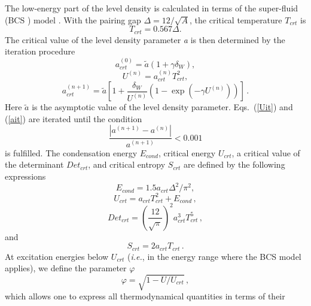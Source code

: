 The low-energy part of the level density is calculated in terms of the
super-fluid (BCS%
) model \cite{igna}. With the pairing gap $\Delta=12/%
\sqrt{A}$, the critical temperature $T_{crt}$ is
\begin{equation}
T_{crt}=0.567\Delta.  \label{Tcrt}
\end{equation}
The critical value of the level density parameter \emph{a} is then
determined by the iteration procedure
\begin{equation}
a_{crt}^{(0)}=\widetilde{a}\left(1+\gamma\delta_{W}\right),  \label{ait0}
\end{equation}
\begin{equation}
U^{(n)}=a_{crt}^{(n)}T_{crt}^{2},  \label{Uit}
\end{equation}
\begin{equation}
a_{crt}^{(n+1)}=\widetilde{a}\left[1+\frac{\delta_{W}}{U^{(n)}}%
\left(1-\exp\left(-\gamma U^{(n)}\right)\right)\right]\,.  \label{ait}
\end{equation}
Here $\widetilde{a}$ is the asymptotic value of the level density
parameter. Eqs.~(\ref{Uit}) and (\ref{ait}) are iterated until the condition
\begin{equation}
\frac{\left|a^{(n+1)}-a^{(n)}\right|}{a^{(n+1)}}<0.001  \label{itercond}
\end{equation}
is fulfilled. The condensation energy $E_{cond}$, critical energy $U_{crt}$,
a critical value of the determinant $Det_{crt}$, and critical entropy $%
S_{crt}$ are defined by the following expressions
\begin{equation}
E_{cond}=1.5a_{crt}\Delta^{2}/\pi^{2},  \label{Econd}
\end{equation}
\begin{equation}
U_{crt}=a_{crt}T_{crt}^{2}+E_{cond}\,,  \label{Ucrt}
\end{equation}
\begin{equation}
Det_{crt}=\left(\frac{12}{\sqrt{\pi}}\right)^{2}a_{crt}^{3}T_{crt}^{5}\,,
\label{Detcrt}
\end{equation}
and
\begin{equation}
S_{crt}=2a_{crt}T_{crt}\,.  \label{Scrt}
\end{equation}
At excitation energies below $U_{crt}$ (\textit{i.e.}, in the energy range
\noindent where the BCS%
 model applies), we define the parameter $\varphi$
\begin{equation}
\varphi=%
\sqrt{1-U/U_{crt}}\,,  \label{fiign}
\end{equation}
which allows one to express all thermodynamical quantities in terms of their
